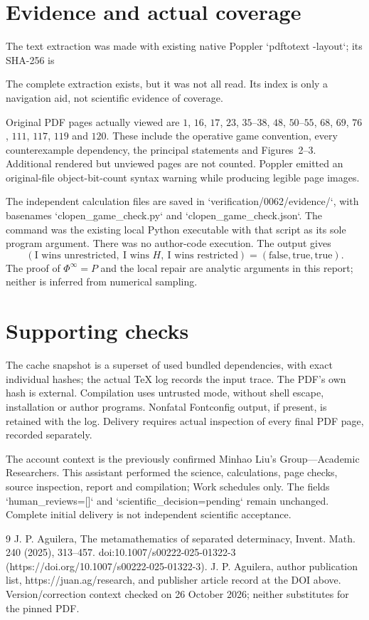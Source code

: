 \documentclass[10pt]{article}
\begin{document}
\section*{Evidence and actual coverage}
The text extraction was made with existing native Poppler `pdftotext -layout`; its SHA-256 is\par
The complete extraction exists, but it was not all read. Its index is only a navigation aid, not scientific evidence of coverage.\par
Original PDF pages actually viewed are \(1\), \(16\), \(17\), \(23\), \(35\)–\(38\), \(48\), \(50\)–\(55\), \(68\), \(69\), \(76\), \(111\), \(117\), \(119\) and \(120\). These include the operative game convention, every counterexample dependency, the principal statements and Figures 2–3. Additional rendered but unviewed pages are not counted. Poppler emitted an original-file object-bit-count syntax warning while producing legible page images.\par
The independent calculation files are saved in `verification/0062/evidence/`, with basenames `clopen\_game\_check.py` and `clopen\_game\_check.json`. The command was the existing local Python executable with that script as its sole program argument. There was no author-code execution. The output gives \[(\text{I wins unrestricted},\ \text{I wins }H,\ \text{I wins restricted})
 =(\mathrm{false},\mathrm{true},\mathrm{true}).\] The proof of \(\Phi^\infty=P\) and the local repair are analytic arguments in this report; neither is inferred from numerical sampling.\par
\section*{Supporting checks}
The cache snapshot is a superset of used bundled dependencies, with exact individual hashes; the actual TeX log records the input trace. The PDF’s own hash is external. Compilation uses untrusted mode, without shell escape, installation or author programs. Nonfatal Fontconfig output, if present, is retained with the log. Delivery requires actual inspection of every final PDF page, recorded separately.\par
The account context is the previously confirmed Minhao Liu’s Group—Academic Researchers. This assistant performed the science, calculations, page checks, source inspection, report and compilation; Work schedules only. The fields `human\_reviews=[]` and `scientific\_decision=pending` remain unchanged. Complete initial delivery is not independent scientific acceptance.\par
9 J. P. Aguilera, The metamathematics of separated determinacy, Invent. Math. 240 (2025), 313–457. doi:10.1007/s00222-025-01322-3 (https://doi.org/10.1007/s00222-025-01322-3). J. P. Aguilera, author publication list, https://juan.ag/research, and publisher article record at the DOI above. Version/correction context checked on 26 October 2026; neither substitutes for the pinned PDF.\par
\end{document}
